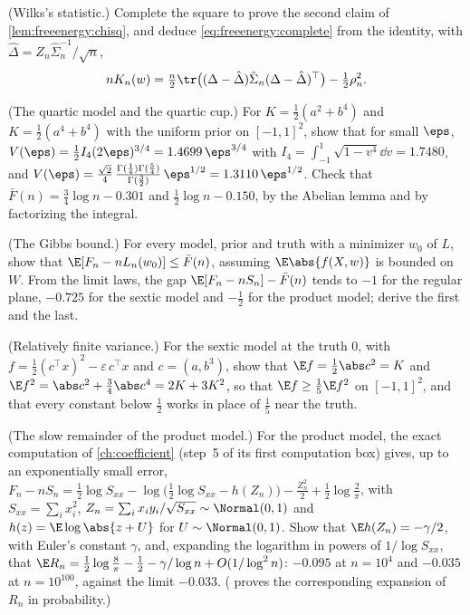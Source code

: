 \begin{refsection}
\begin{exercises}
\item \consolidation (Wilks's statistic.)\label{ex:freeenergy:wilks} Complete the square to prove the second claim of \cref{lem:freeenergy:chisq}, and deduce \eqref{eq:freeenergy:complete} from the identity, with $\hat\Delta=Z_n\hat\Sigma_n^{-1}/\sqrt n$,
\[
nK_n(w)=\tfrac n2\tr\bigl((\Delta-\hat\Delta)\hat\Sigma_n(\Delta-\hat\Delta)^\top\bigr)-\tfrac12\rho_n^2 .
\]

\item \consolidation (The quartic model and the quartic cup.) For $K=\frac12(a^2+b^4)$ and $K=\frac12(a^4+b^4)$ with the uniform prior on $[-1,1]^2$, show that for small $\eps$, $V(\eps)=\frac12I_4(2\eps)^{3/4}=1.4699\,\eps^{3/4}$ with $I_4=\int_{-1}^1\sqrt{1-v^4}\dd v=1.7480$, and $V(\eps)=\frac{\sqrt2}4\,\frac{\Gamma(\frac14)\Gamma(\frac54)}{\Gamma(\frac32)}\,\eps^{1/2}=1.3110\,\eps^{1/2}$. Check that $\bar F(n)=\frac34\log n-0.301$ and $\frac12\log n-0.150$, by the Abelian lemma and by factorizing the integral.\label{ex:freeenergy:quartic}

\item \consolidation (The Gibbs bound.) For every model, prior and truth with a minimizer $w_0$ of $L$, show that $\E[F_n-nL_n(w_0)]\le\bar F(n)$, assuming $\E\abs{f(X,w)}$ is bounded on $W$.  From the limit laws, the gap $\E[F_n-nS_n]-\bar F(n)$ tends to $-1$ for the regular plane, $-0.725$ for the sextic model and $-\frac12$ for the product model; derive the first and the last.\label{ex:freeenergy:gibbs}

\item \consolidation (Relatively finite variance.) For the sextic model at the truth $0$, with $f=\frac12(c^\top x)^2-\varepsilon\,c^\top x$ and $c=(a,b^3)$, show that $\E f=\frac12\abs c^2=K$ and $\E f^2=\abs c^2+\frac34\abs c^4=2K+3K^2$, so that $\E f\ge\frac15\E f^2$ on $[-1,1]^2$, and that every constant below $\frac12$ works in place of $\frac15$ near the truth.\label{ex:freeenergy:rfv}

\item \consolidation (The slow remainder of the product model.) For the product model, the exact computation of \cref{ch:coefficient} (step~5 of its first computation box) gives, up to an exponentially small error, $F_n-nS_n=\frac12\log S_{xx}-\log\bigl(\frac12\log S_{xx}-h(Z_n)\bigr)-\frac{Z_n^2}2+\frac12\log\frac2\pi$, with $S_{xx}=\sum_ix_i^2$, $Z_n=\sum_ix_iy_i/\sqrt{S_{xx}}\sim\Normal(0,1)$ and $h(z)=\E\log\abs{z+U}$ for $U\sim\Normal(0,1)$. Show that $\E h(Z_n)=-\gamma/2$, with Euler's constant $\gamma$, and, expanding the logarithm in powers of $1/\log S_{xx}$, that $\E R_n=\frac12\log\frac8\pi-\frac12-\gamma/\log n+O(1/\log^2n)$: $-0.095$ at $n=10^4$ and $-0.035$ at $n=10^{100}$, against the limit $-0.033$. ( proves the corresponding expansion of $R_n$ in probability.)\label{ex:freeenergy:slow}


\end{exercises}
\end{refsection}
